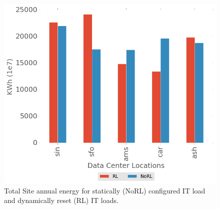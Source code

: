 \begin{figure}
  \centering
  \includegraphics[scale=0.4]{building_energy_model/img/power_comps.png}
  \caption[Comparison of energy demand for two models]{Total Site annual energy for statically (NoRL) configured IT load and dynamically reset (RL) IT loads.}
  \label{fig:total_energy_comp}
  \end{figure}